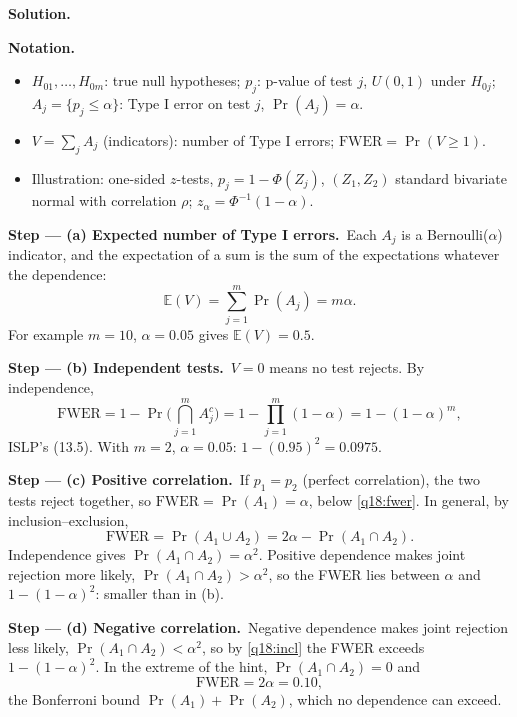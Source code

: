 \documentclass[11pt,a4paper]{article}
\numberwithin{equation}{questao}   %
\newenvironment{notacao}{\par\smallskip\noindent\textbf{Notation.}\begin{itemize}[leftmargin=1.4em,topsep=1pt,itemsep=0pt]\small}{\end{itemize}}
\newcommand{\passo}[2]{\par\smallskip\noindent\textbf{Step --- #1.}~#2}
\newcommand{\solhead}{\par\medskip\noindent{\color{blue!55!black}\rule{\linewidth}{0.3pt}}\par\noindent\textbf{Solution.}}
\newcommand{\E}{\mathbb{E}}
\begin{document}
\begin{sol}
\solhead
\begin{notacao}
\item $H_{01},\dots,H_{0m}$: true null hypotheses; $p_j$: p-value of test $j$, $U(0,1)$ under
  $H_{0j}$; $A_j=\{p_j\le\alpha\}$: Type I error on test $j$, $\Pr(A_j)=\alpha$.
\item $V=\sum_jA_j$ (indicators): number of Type I errors; $\mathrm{FWER}=\Pr(V\ge1)$.
\item Illustration: one-sided $z$-tests, $p_j=1-\Phi(Z_j)$, $(Z_1,Z_2)$ standard bivariate normal with
  correlation $\rho$; $z_\alpha=\Phi^{-1}(1-\alpha)$.
\end{notacao}

\passo{(a) Expected number of Type I errors}{Each $A_j$ is a Bernoulli($\alpha$) indicator, and the
expectation of a sum is the sum of the expectations whatever the dependence:}
\begin{equation}\label{q18:EV}
\E(V)=\sum_{j=1}^m\Pr(A_j)=m\alpha .
\end{equation}
For example $m=10$, $\alpha=0.05$ gives $\E(V)=0.5$.

\passo{(b) Independent tests}{$V=0$ means no test rejects. By independence,}
\begin{equation}\label{q18:fwer}
\mathrm{FWER}=1-\Pr\Big(\bigcap_{j=1}^mA_j^c\Big)=1-\prod_{j=1}^m(1-\alpha)=1-(1-\alpha)^m ,
\end{equation}
ISLP's (13.5). With $m=2$, $\alpha=0.05$: $1-(0.95)^2=0.0975$.

\passo{(c) Positive correlation}{If $p_1=p_2$ (perfect correlation), the two tests reject together,
so $\mathrm{FWER}=\Pr(A_1)=\alpha$, below \eqref{q18:fwer}. In general, by inclusion--exclusion,}
\begin{equation}\label{q18:incl}
\mathrm{FWER}=\Pr(A_1\cup A_2)=2\alpha-\Pr(A_1\cap A_2).
\end{equation}
Independence gives $\Pr(A_1\cap A_2)=\alpha^2$. Positive dependence makes joint rejection more
likely, $\Pr(A_1\cap A_2)>\alpha^2$, so the FWER lies between $\alpha$ and $1-(1-\alpha)^2$: smaller
than in (b).

\passo{(d) Negative correlation}{Negative dependence makes joint rejection less likely,
$\Pr(A_1\cap A_2)<\alpha^2$, so by \eqref{q18:incl} the FWER exceeds $1-(1-\alpha)^2$. In the extreme
of the hint, $\Pr(A_1\cap A_2)=0$ and}
\[
\mathrm{FWER}=2\alpha=0.10 ,
\]
the Bonferroni bound $\Pr(A_1)+\Pr(A_2)$, which no dependence can exceed.


\end{sol}
\end{document}
